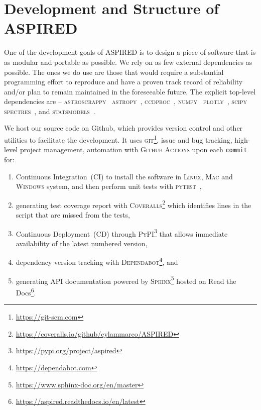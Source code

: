 \documentclass[fleqn,usenatbib]{mnras}
\begin{document}
\section{Development and Structure of \textsc{ASPIRED}}

One of the development goals of \textsc{ASPIRED} is to design a piece of software that is as
modular and portable as possible. We rely on as few external dependencies as possible.
The ones we do use are those that would require a substantial programming effort to reproduce and have a
proven track record of reliability and/or plan to remain maintained in the
foreseeable future. The explicit top-level dependencies are --
\textsc{astroscrappy}~\citep{curtis_mccully_2018_1482019, 2001PASP..113.1420V}
\textsc{astropy}~\citep{astropy:2013, astropy:2018},
\textsc{ccdproc}~\citep{matt_craig_2017_1069648},
\textsc{numpy}~\citep{2020NumPy-Array}
\textsc{plotly}~\citep{plotly},
\textsc{scipy}~\citep{2020SciPy-NMeth}
\textsc{spectres}~\citep{2017arXiv170505165C}, and
\textsc{statsmodels}~\citep{seabold2010statsmodels}. 

We host our source code on Github, which provides version control and other
utilities to facilitate the development. It uses \textsc{git}\footnote{\url{https://git-scm.com}},
issue and bug tracking, high-level project management, automation with \textsc{Github Actions}
upon each \texttt{commit} for:

\begin{enumerate}
    \item Continuous Integration~(CI) to install the software in \textsc{Linux}, \textsc{Mac} and \textsc{Windows} system, and then perform unit tests with \textsc{pytest}~\citep{pytest6.2},
    \item generating test coverage report with \textsc{Coveralls}\footnote{\url{https://coveralls.io/github/cylammarco/ASPIRED}} which identifies lines in the script that are missed from the tests,
    \item Continuous Deployment~(CD) through \textsc{PyPI}\footnote{\url{https://pypi.org/project/aspired}} that allows immediate availability of the latest numbered version,
    \item dependency version tracking with \textsc{Dependabot}\footnote{\url{https://dependabot.com}}, and
    \item generating API documentation powered by \textsc{Sphinx}\footnote{\url{https://www.sphinx-doc.org/en/master}} hosted on Read the Docs\footnote{\url{https://aspired.readthedocs.io/en/latest}}.
\end{enumerate}
\end{document}
